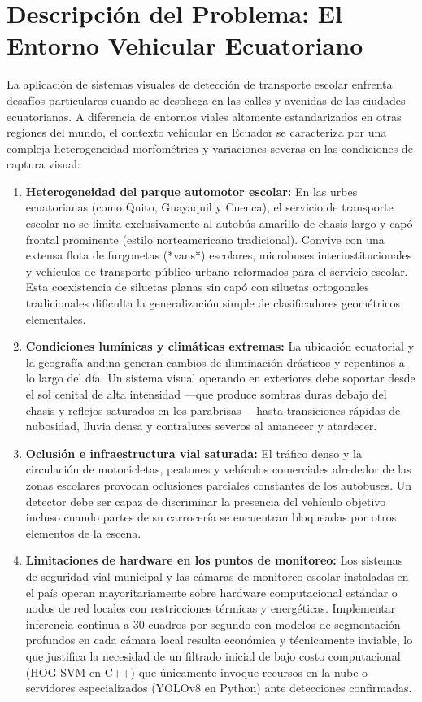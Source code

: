 \documentclass[12pt]{article}
\begin{document}
\section{Descripción del Problema: El Entorno Vehicular Ecuatoriano}
La aplicación de sistemas visuales de detección de transporte escolar enfrenta desafíos particulares cuando se despliega en las calles y avenidas de las ciudades ecuatorianas. A diferencia de entornos viales altamente estandarizados en otras regiones del mundo, el contexto vehicular en Ecuador se caracteriza por una compleja heterogeneidad morfométrica y variaciones severas en las condiciones de captura visual:

\begin{enumerate}
    \item \textbf{Heterogeneidad del parque automotor escolar:} En las urbes ecuatorianas (como Quito, Guayaquil y Cuenca), el servicio de transporte escolar no se limita exclusivamente al autobús amarillo de chasis largo y capó frontal prominente (estilo norteamericano tradicional). Convive con una extensa flota de furgonetas (*vans*) escolares, microbuses interinstitucionales y vehículos de transporte público urbano reformados para el servicio escolar. Esta coexistencia de siluetas planas sin capó con siluetas ortogonales tradicionales dificulta la generalización simple de clasificadores geométricos elementales.
    \item \textbf{Condiciones lumínicas y climáticas extremas:} La ubicación ecuatorial y la geografía andina generan cambios de iluminación drásticos y repentinos a lo largo del día. Un sistema visual operando en exteriores debe soportar desde el sol cenital de alta intensidad —que produce sombras duras debajo del chasis y reflejos saturados en los parabrisas— hasta transiciones rápidas de nubosidad, lluvia densa y contraluces severos al amanecer y atardecer.
    \item \textbf{Oclusión e infraestructura vial saturada:} El tráfico denso y la circulación de motocicletas, peatones y vehículos comerciales alrededor de las zonas escolares provocan oclusiones parciales constantes de los autobuses. Un detector debe ser capaz de discriminar la presencia del vehículo objetivo incluso cuando partes de su carrocería se encuentran bloqueadas por otros elementos de la escena.
    \item \textbf{Limitaciones de hardware en los puntos de monitoreo:} Los sistemas de seguridad vial municipal y las cámaras de monitoreo escolar instaladas en el país operan mayoritariamente sobre hardware computacional estándar o nodos de red locales con restricciones térmicas y energéticas. Implementar inferencia continua a 30 cuadros por segundo con modelos de segmentación profundos en cada cámara local resulta económica y técnicamente inviable, lo que justifica la necesidad de un filtrado inicial de bajo costo computacional (HOG-SVM en C++) que únicamente invoque recursos en la nube o servidores especializados (YOLOv8 en Python) ante detecciones confirmadas.
\end{enumerate}
\end{document}
